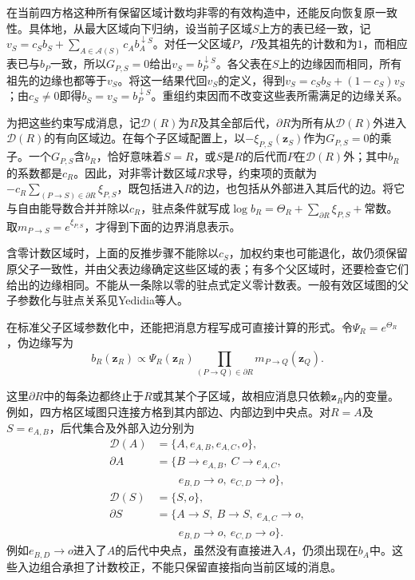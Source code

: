 在当前四方格这种所有保留区域计数均非零的有效构造中，还能反向恢复原一致性。具体地，从最大区域向下归纳，设当前子区域$S$上方的表已经一致，记$v_S=c_Sb_S+\sum_{A\in\mathcal A(S)}c_A b_A^{\downarrow S}$。对任一父区域$P$，$P$及其祖先的计数和为$1$，而相应表已与$b_P$一致，所以$G_{P,S}=0$给出$v_S=b_P^{\downarrow S}$。各父表在$S$上的边缘因而相同，所有祖先的边缘也都等于$v_S$。将这一结果代回$v_S$的定义，得到$v_S=c_Sb_S+(1-c_S)v_S$；由$c_S\ne0$即得$b_S=v_S=b_P^{\downarrow S}$。重组约束因而不改变这些表所需满足的边缘关系。

为把这些约束写成消息，记$\mathcal D(R)$为$R$及其全部后代，$\partial R$为所有从$\mathcal D(R)$外进入$\mathcal D(R)$的有向区域边。在每个子区域配置上，以$-\xi_{P,S}(\bm z_S)$作为$G_{P,S}=0$的乘子。一个$G_{P,S}$含$b_R$，恰好意味着$S=R$，或$S$是$R$的后代而$P$在$\mathcal D(R)$外；其中$b_R$的系数都是$c_R$。因此，对非零计数区域$R$求导，约束项的贡献为$-c_R\sum_{(P\to S)\in\partial R}\xi_{P,S}$，既包括进入$R$的边，也包括从外部进入其后代的边。将它与自由能导数合并并除以$c_R$，驻点条件就写成$\log b_R=\Theta_R+\sum_{\partial R}\xi_{P,S}+\text{常数}$。取$m_{P\to S}=e^{\xi_{P,S}}$，才得到下面的边界消息表示。

含零计数区域时，上面的反推步骤不能除以$c_S$，加权约束也可能退化，故仍须保留原父子一致性，并由父表边缘确定这些区域的表；有多个父区域时，还要检查它们给出的边缘相同。不能从一条除以零的驻点式定义零计数表。一般有效区域图的父子参数化与驻点关系见Yedidia等人。

在标准父子区域参数化中，还能把消息方程写成可直接计算的形式。令$\Psi_R=e^{\Theta_R}$，伪边缘写为
\[
  b_R(\bm z_R)\propto
    \Psi_R(\bm z_R)
       \prod_{(P\to Q)\in\partial R}m_{P\to Q}(\bm z_Q).
\]

这里$\partial R$中的每条边都终止于$R$或其某个子区域，故相应消息只依赖$\bm z_R$内的变量。例如，四方格区域图只连接方格到其内部边、内部边到中央点。对$R=A$及$S=e_{A,B}$，后代集合及外部入边分别为
\[
  \begin{aligned}
    \mathcal D(A)&=\{A,e_{A,B},e_{A,C},o\},\\
    \partial A&=\{B\to e_{A,B},\ C\to e_{A,C},\\
              &\qquad e_{B,D}\to o,\ e_{C,D}\to o\},\\
    \mathcal D(S)&=\{S,o\},\\
    \partial S&=\{A\to S,\ B\to S,\ e_{A,C}\to o,\\
              &\qquad e_{B,D}\to o,\ e_{C,D}\to o\}.
  \end{aligned}
\]
例如$e_{B,D}\to o$进入了$A$的后代中央点，虽然没有直接进入$A$，仍须出现在$b_A$中。这些入边组合承担了计数校正，不能只保留直接指向当前区域的消息。

